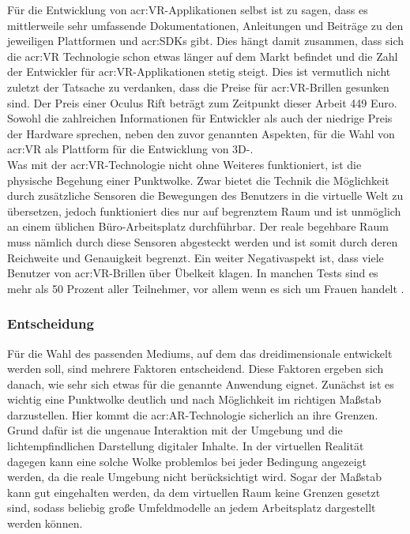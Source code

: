 Für die Entwicklung von \acrshort{acr:VR}-Applikationen selbst ist zu sagen, dass es mittlerweile sehr umfassende Dokumentationen, Anleitungen und Beiträge zu den jeweiligen Plattformen und \glspl{acr:SDK} gibt. Dies hängt damit zusammen, dass sich die \acrlong{acr:VR} Technologie schon etwas länger auf dem Markt befindet und die Zahl der Entwickler für \acrshort{acr:VR}-Applikationen stetig steigt. Dies ist vermutlich nicht zuletzt der Tatsache zu verdanken, dass die Preise für \acrshort{acr:VR}-Brillen gesunken sind. Der Preis einer Oculus Rift beträgt zum Zeitpunkt dieser Arbeit 449 Euro. Sowohl die zahlreichen Informationen für Entwickler als auch der niedrige Preis der Hardware sprechen, neben den zuvor genannten Aspekten, für die Wahl von \acrlong{acr:VR} als Plattform für die Entwicklung von 3D-.\\

Was mit der \acrshort{acr:VR}-Technologie nicht ohne Weiteres funktioniert, ist die physische Begehung einer Punktwolke. Zwar bietet die Technik die Möglichkeit durch zusätzliche Sensoren die Bewegungen des Benutzers in die virtuelle Welt zu übersetzen, jedoch funktioniert dies nur auf begrenztem Raum und ist unmöglich an einem üblichen Büro-Arbeitsplatz durchführbar. Der reale begehbare Raum muss nämlich durch diese Sensoren abgesteckt werden und ist somit durch deren Reichweite und Genauigkeit begrenzt. Ein weiter Negativaspekt ist, dass viele Benutzer von \acrshort{acr:VR}-Brillen über Übelkeit klagen. In manchen Tests sind es mehr als 50 Prozent aller Teilnehmer, vor allem wenn es sich um Frauen handelt \cite{bib:VRSickness}. 

\subsubsection{Entscheidung}
Für die Wahl des passenden Mediums, auf dem das dreidimensionale  entwickelt werden soll, sind mehrere Faktoren entscheidend. Diese Faktoren ergeben sich danach, wie sehr sich etwas für die genannte Anwendung eignet. Zunächst ist es wichtig eine Punktwolke deutlich und nach Möglichkeit im richtigen Maßstab darzustellen. Hier kommt die \acrlong{acr:AR}-Technologie sicherlich an ihre Grenzen. Grund dafür ist die ungenaue Interaktion mit der Umgebung und die lichtempfindlichen Darstellung digitaler Inhalte. In der virtuellen Realität dagegen kann eine solche Wolke problemlos bei jeder Bedingung angezeigt werden, da die reale Umgebung nicht berücksichtigt wird. Sogar der Maßstab kann gut eingehalten werden, da dem virtuellen Raum keine Grenzen gesetzt sind, sodass beliebig große Umfeldmodelle an jedem Arbeitsplatz dargestellt werden können.\\

